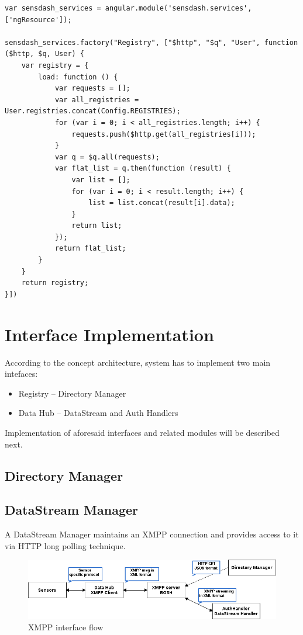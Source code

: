     \begin{lstlisting}[label=angular_service,caption=Factory Service of Registry]
var sensdash_services = angular.module('sensdash.services', ['ngResource']);

sensdash_services.factory("Registry", ["$http", "$q", "User", function ($http, $q, User) {
    var registry = {
        load: function () {
            var requests = [];
            var all_registries = User.registries.concat(Config.REGISTRIES);
            for (var i = 0; i < all_registries.length; i++) {
                requests.push($http.get(all_registries[i]));
            }
            var q = $q.all(requests);
            var flat_list = q.then(function (result) {
                var list = [];
                for (var i = 0; i < result.length; i++) {
                    list = list.concat(result[i].data);
                }
                return list;
            });
            return flat_list;
        }
    }
    return registry;
}])
    \end{lstlisting}


\section{Interface Implementation}
	 According to the concept architecture, system has to implement two main intefaces:
	 \begin{itemize}
	 \item Registry -- Directory Manager
	 \item Data Hub -- DataStream and Auth Handlers 
	 \end{itemize}

	 Implementation of aforesaid interfaces and related modules will be described next.

\subsection{Directory Manager}
\subsection{DataStream Manager}
	A DataStream Manager maintains an XMPP connection and provides access to it via HTTP long polling technique.
	    \begin{figure}[!ht]
		\centering
		\includegraphics[scale=0.6]{images/XMPPflow.png}   
		\caption[XMPP BOSH/Stream]{XMPP interface flow}                      
		\end{figure}

